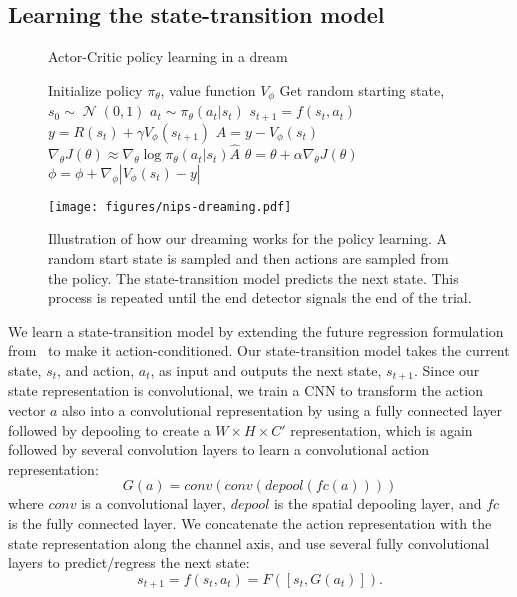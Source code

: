 \documentclass[letterpaper, 10 pt, conference]{ieeeconf}
\DeclareMathOperator{\N}{\mathcal{N}}
\begin{document}
\subsection{Learning the state-transition model}

\begin{figure*}
\centering
\begin{minipage}{0.55\textwidth}
\begin{algorithm}[H]
  \caption{Actor-Critic policy learning in a dream
    \label{alg:policy-learning}}  
  \begin{algorithmic}  
    \State Initialize policy $\pi_\theta$, value function $V_\phi$
    \State Get random starting state, $s_0 \sim \N(0,1)$
        \State $a_t \sim \pi_\theta(a_t|s_t)$
        \State $s_{t+1} = f(s_t, a_t)$
        \State $y = R(s_t) + \gamma V_\phi(s_{t+1})$
        \State $\hat{A} = y - V_\phi(s_t)$
        \State $\nabla_\theta J(\theta) \approx \nabla_\theta \log \pi_\theta (a_t|s_t) \hat{A}$
        \State $\theta = \theta + \alpha\nabla_\theta J(\theta)$
        \State $\phi = \phi + \nabla_\phi |V_\phi(s_t) - y|$
    \EndFor
    \EndFor
    \EndFunction
  \end{algorithmic}  
\end{algorithm}
\end{minipage}
\hfill
\begin{minipage}{0.43\textwidth}
\centering
\texttt{[image: figures/nips-dreaming.pdf]}
\caption{Illustration of how our dreaming works for the policy learning. A random start state is sampled and then actions are sampled from the policy. The state-transition model predicts the next state. This process is repeated until the end detector signals the end of the trial.}
\label{fig:test}
\end{minipage}
\end{figure*}

We learn a state-transition model by extending the future regression formulation from~\cite{lee2017learning} to make it action-conditioned. Our state-transition model takes the current state, $s_t$, and action, $a_t$, as input and outputs the next state, $s_{t+1}$. Since our state representation is convolutional, we train a CNN to transform the action vector $a$ also into a convolutional representation by using a fully connected layer followed by depooling to create a $W\times H\times C'$ representation, which is again followed by several convolution layers to learn a convolutional action representation:
\begin{equation}
    G(a) = conv(conv(depool(fc(a))))
\end{equation}
where $conv$ is a convolutional layer, $depool$ is the spatial depooling layer, and $fc$ is the fully connected layer.
We concatenate the action representation with the state representation along the channel axis, and use several fully convolutional layers to predict/regress the next state:
\begin{equation}
    s_{t+1} = f(s_t, a_t) = F([s_t, G(a_t)]).
\end{equation}
\end{document}
